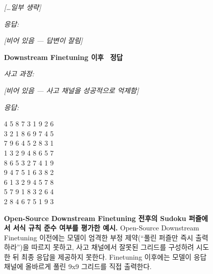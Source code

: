 \begin{figure}[htbp]
\begin{minipage}[t]{0.49\textwidth}
\begin{mdframed}[style=beforebox]
\begin{mdframed}[style=thinkbox]
{\itshape [\ldots 일부 생략]}
\end{mdframed}
\vspace{2pt}
\noindent\textit{응답:}
\begin{mdframed}[style=thinkbox]
\textit{[비어 있음 --- 답변이 잘림]}
\end{mdframed}
\end{mdframed}
\end{minipage}%
\hfill
\begin{minipage}[t]{0.49\textwidth}
\begin{mdframed}[style=afterbox]
\noindent\textbf{Downstream Finetuning 이후} \hfill {\colorbox{afterbg}{\textcolor{afterframe}{\textbf{\checkmark~정답}}}}

\noindent\textit{사고 과정:}
\begin{mdframed}[style=thinkbox]
\textit{[비어 있음 --- 사고 채널을 성공적으로 억제함]}
\end{mdframed}
\vspace{2pt}
\noindent\textit{응답:}
\begin{mdframed}[style=thinkbox]
4 5 8 7 3 1 9 2 6 \\
3 2 1 8 6 9 7 4 5 \\
7 9 6 4 5 2 8 3 1 \\
1 3 2 9 4 8 6 5 7 \\
8 6 5 3 2 7 4 1 9 \\
9 4 7 5 1 6 3 8 2 \\
6 1 3 2 9 4 5 7 8 \\
5 7 9 1 8 3 2 6 4 \\
2 8 4 6 7 5 1 9 3
\end{mdframed}
\end{mdframed}
\end{minipage}
\caption{\textbf{Open-Source Downstream Finetuning 전후의 Sudoku 퍼즐에서 서식 규칙 준수 여부를 평가한 예시.} Open-Source Downstream Finetuning 이전에는 모델이 엄격한 부정 제약(``풀린 퍼즐만 즉시 출력하라'')을 따르지 못하고, 사고 채널에서 잘못된 그리드를 구성하려 시도한 뒤 최종 응답을 제공하지 못한다. Finetuning 이후에는 모델이 응답 채널에 올바르게 풀린 9x9 그리드를 직접 출력한다.}
\label{fig:sudoku-rl-example}
\end{figure}
